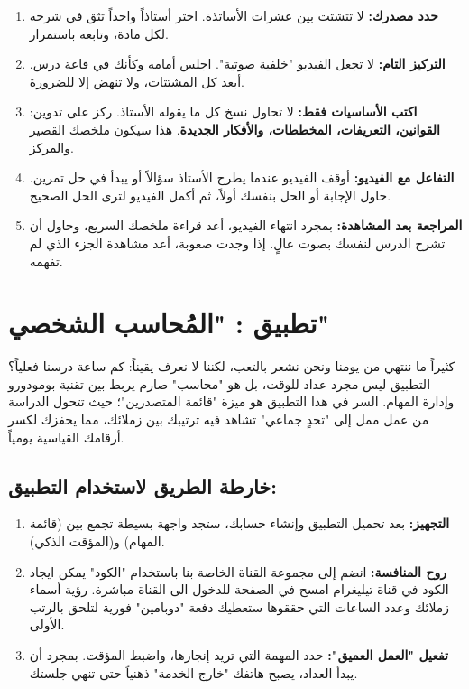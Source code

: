 \documentclass[12pt,a4paper]{book}
\begin{document}
\begin{enumerate}
	\item \textbf{حدد مصدرك:} لا تتشتت بين عشرات الأساتذة. اختر أستاذاً واحداً تثق في شرحه لكل مادة، وتابعه باستمرار.
	\item \textbf{التركيز التام:} لا تجعل الفيديو "خلفية صوتية". اجلس أمامه وكأنك في قاعة درس. أبعد كل المشتتات، ولا تنهض إلا للضرورة.
	\item \textbf{اكتب الأساسيات فقط:} لا تحاول نسخ كل ما يقوله الأستاذ. ركز على تدوين: \textbf{القوانين، التعريفات، المخططات، والأفكار الجديدة}. هذا سيكون ملخصك القصير والمركز.
	\item \textbf{التفاعل مع الفيديو:} أوقف الفيديو عندما يطرح الأستاذ سؤالاً أو يبدأ في حل تمرين. حاول الإجابة أو الحل بنفسك أولاً، ثم أكمل الفيديو لترى الحل الصحيح.
	\item \textbf{المراجعة بعد المشاهدة:} بمجرد انتهاء الفيديو، أعد قراءة ملخصك السريع، وحاول أن تشرح الدرس لنفسك بصوت عالٍ. إذا وجدت صعوبة، أعد مشاهدة الجزء الذي لم تفهمه.
\end{enumerate}

\section{تطبيق : "المُحاسب الشخصي"}

كثيراً ما ننتهي من يومنا ونحن نشعر بالتعب، لكننا لا نعرف يقيناً: كم ساعة درسنا فعلياً؟ التطبيق ليس مجرد عداد للوقت، بل هو "محاسب" صارم يربط بين تقنية بومودورو وإدارة المهام. السر في هذا التطبيق هو ميزة "قائمة المتصدرين"؛ حيث تتحول الدراسة من عمل ممل إلى "تحدٍ جماعي" تشاهد فيه ترتيبك بين زملائك، مما يحفزك لكسر أرقامك القياسية يومياً.

\subsection*{خارطة الطريق لاستخدام التطبيق:}
\begin{enumerate}
	\item \textbf{التجهيز:} بعد تحميل التطبيق وإنشاء حسابك، ستجد واجهة بسيطة تجمع بين (قائمة المهام) و(المؤقت الذكي).
	\item \textbf{روح المنافسة:} انضم إلى مجموعة القناة الخاصة بنا باستخدام "الكود" يمكن ايجاد الكود في قناة تيليغرام امسح   في الصفحة \pageref{part:start} للدخول الى القناة مباشرة.  رؤية أسماء زملائك وعدد الساعات التي حققوها ستعطيك دفعة "دوبامين" فورية لتلحق بالرتب الأولى.
	\item \textbf{تفعيل "العمل العميق":} حدد المهمة التي تريد إنجازها، واضبط المؤقت. بمجرد أن يبدأ العداد، يصبح هاتفك "خارج الخدمة" ذهنياً حتى تنهي جلستك.
\end{enumerate}
\end{document}
